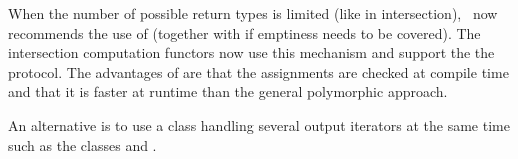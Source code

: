 When the number of possible return types is limited (like in intersection), \cgal\ now recommends the use of
 (together with 
if emptiness needs to be covered). The intersection computation functors now use this mechanism and support the
the  protocol. The advantages of  are that
the assignments are checked at compile time and that it is faster at runtime than the general polymorphic approach.

An alternative is to use a class handling several output iterators at the same time such as the classes
and
.

